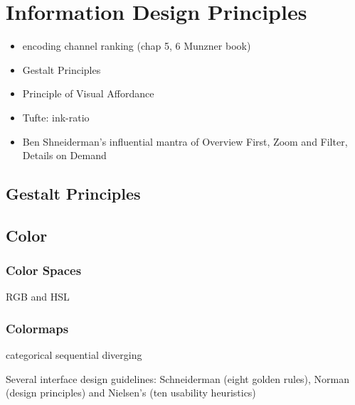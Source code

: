 \section{Information Design Principles}
\begin{itemize}
	\item encoding channel ranking (chap 5, 6 Munzner book)
	\item Gestalt Principles
	\item Principle of Visual Affordance
	\item Tufte: ink-ratio
	\item Ben Shneiderman’s influential mantra of Overview First, Zoom and Filter, Details on Demand
\end{itemize}

\subsection{Gestalt Principles}
\label{sub:lr-gestalt}

\subsection{Color}

\subsubsection {Color Spaces}
RGB and HSL

\subsubsection {Colormaps}

categorical
sequential
diverging





Several interface design guidelines: Schneiderman (eight golden rules), Norman (design principles) and Nielsen’s (ten usability heuristics)



%
%


